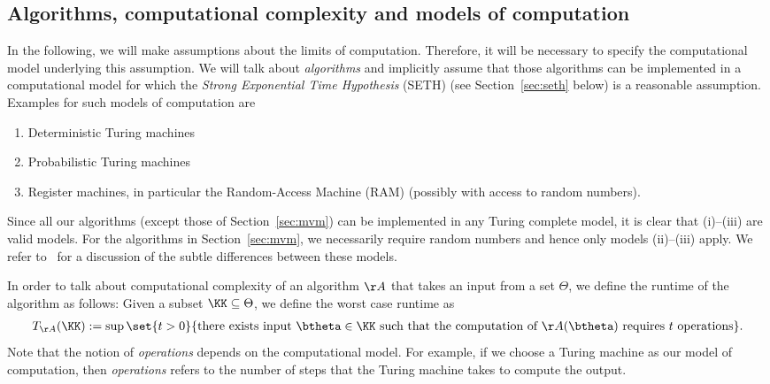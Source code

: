 \documentclass{amsart}[11pt]
\numberwithin{equation}{section}
\newcommand{\worstTime}{T}
\numberwithin{theorem}{section}
\begin{document}
\subsection{Algorithms, computational complexity and models of computation}\label{sec:algorithms}
    In the following, we will make assumptions about the limits of computation. Therefore, it will be necessary to specify the computational model underlying this assumption.
    We will talk about \emph{algorithms} and implicitly assume that those algorithms can be implemented in a computational model for which the \emph{Strong Exponential Time Hypothesis} (SETH) (see Section~\ref{sec:seth} below) is a reasonable assumption.
    Examples for such models of computation are 
    \begin{enumerate}
        \item[(i)] Deterministic Turing machines
        \item[(ii)] Probabilistic Turing machines
        \item[(iii)] Register machines, in particular the Random-Access Machine (RAM) (possibly with access to random numbers).
    \end{enumerate}
    Since all our algorithms (except those of Section~\ref{sec:mvm}) can be implemented in any Turing complete model, it is clear that (i)--(iii) are valid models. For the algorithms in Section~\ref{sec:mvm}, we necessarily require random numbers and hence only models (ii)--(iii) apply. We refer to~\cite{compmodel} for a discussion of the subtle differences between these models.

    In order to talk about computational complexity of an algorithm $\AA$ that takes an input from a set $\Theta$, we define the runtime of the algorithm as follows: Given a subset $\KK\subseteq \Theta$, we define the worst case runtime as
    \begin{align*}
        \worstTime_{\AA}(\KK) := \sup\set{ t > 0 }{\text{there exists input }\btheta \in \KK\text{ such that the computation of }\AA(\btheta) \text{ requires } t \text{ operations}}.
    \end{align*}
    Note that the notion of \emph{operations} depends on the computational model. For example, if we choose a Turing machine as our model of computation, then \emph{operations} refers to the number of steps that the Turing machine takes to compute the output.
\end{document}
